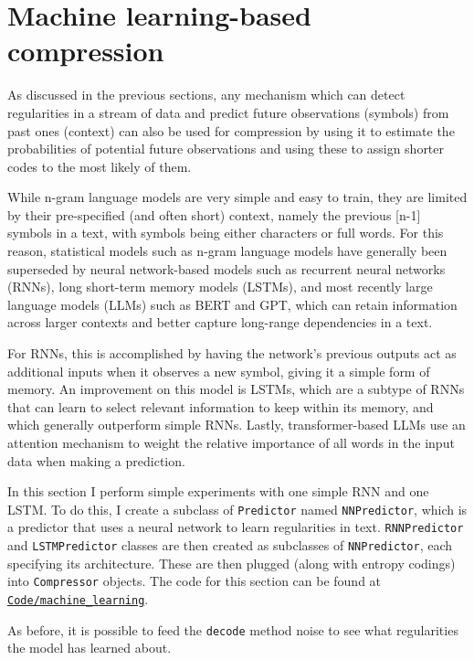 \section{Machine learning-based compression}
\label{sec:machine_learning}

As discussed in the previous sections, any mechanism which can detect regularities in a stream of data and predict future observations (symbols) from past ones (context) can also be used for compression by using it to estimate the probabilities of potential future observations and using these to assign shorter codes to the most likely of them.

While n-gram language models are very simple and easy to train, they are limited by their pre-specified (and often short) context, namely the previous [n-1] symbols in a text, with symbols being either characters or full words. For this reason, statistical models such as n-gram language models have generally been superseded by neural network-based models such as recurrent neural networks (RNNs), long short-term memory models (LSTMs), and most recently large language models (LLMs) such as BERT and GPT, which can retain information across larger contexts and better capture long-range dependencies in a text.

For RNNs, this is accomplished by having the network's previous outputs act as additional inputs when it observes a new symbol, giving it a simple form of memory. An improvement on this model is LSTMs, which are a subtype of RNNs that can learn to select relevant information to keep within its memory, and which generally outperform simple RNNs. Lastly, transformer-based LLMs use an attention mechanism to weight the relative importance of all words in the input data when making a prediction.

In this section I perform simple experiments with one simple RNN and one LSTM. To do this, I create a subclass of \texttt{Predictor} named \texttt{NNPredictor}, which is a predictor that uses a neural network to learn regularities in text. \texttt{RNNPredictor} and \texttt{LSTMPredictor} classes are then created as subclasses of \texttt{NNPredictor}, each specifying its architecture. These are then plugged (along with entropy codings) into \texttt{Compressor} objects. The code for this section can be found at \texttt{\href{https://github.com/Guy29/FYP/blob/main/Code/machine_learning}{Code/machine\_learning}}.

As before, it is possible to feed the \texttt{decode} method noise to see what regularities the model has learned about.

